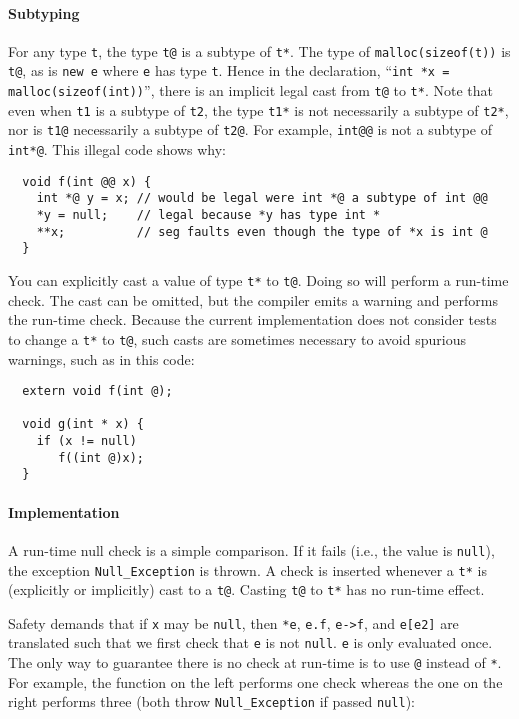 \paragraph{Subtyping}
For any type \texttt{t}, the type \texttt{t@} is a subtype of \texttt{t*}.
The type of \texttt{malloc(sizeof(t))} is \texttt{t@}, as is \texttt{new e}
where \texttt{e} has type \texttt{t}.  Hence in the declaration,
``\texttt{int *x = malloc(sizeof(int))}'', there is an implicit legal
cast from \texttt{t@} to \texttt{t*}.  Note that even when \texttt{t1} is a
subtype of \texttt{t2}, the type \texttt{t1*} is not necessarily a subtype
of \texttt{t2*}, nor is \texttt{t1@} necessarily a subtype of \texttt{t2@}.
For example, \texttt{int@@} is not a subtype of \texttt{int*@}.  This
illegal code shows why:

\begin{verbatim}
  void f(int @@ x) {
    int *@ y = x; // would be legal were int *@ a subtype of int @@
    *y = null;    // legal because *y has type int *
    **x;          // seg faults even though the type of *x is int @
  }
\end{verbatim}

You can explicitly cast a value of type \texttt{t*} to
\texttt{t@}.  Doing so will perform a run-time check.  The
cast can be omitted, but the compiler emits a warning and performs the
run-time check.  Because the current implementation does not
consider tests to change a \texttt{t*} to \texttt{t@}, such casts are
sometimes necessary to avoid spurious warnings, such as in this code:

\begin{verbatim}
  extern void f(int @);

  void g(int * x) {
    if (x != null)
       f((int @)x);
  }
\end{verbatim}

\paragraph{Implementation}
A run-time null check is a simple comparison.  If it fails (i.e., the
value is \texttt{null}), the exception \texttt{Null_Exception} is thrown.
A check is inserted whenever a \texttt{t*} is (explicitly or implicitly)
cast to a \texttt{t@}.  Casting \texttt{t@} to \texttt{t*} has no run-time
effect.

Safety demands that if \texttt{x} may be \texttt{null}, then \texttt{*e},
\texttt{e.f}, \texttt{e->f}, and \texttt{e[e2]} are translated such that we
first check that \texttt{e} is not \texttt{null}.  \texttt{e} is only
evaluated once.  The only way to guarantee there is no check at
run-time is to use \texttt{@} instead of \texttt{*}.  For example, the
function on the left performs one check whereas the one on the right
performs three (both throw \texttt{Null_Exception} if passed
\texttt{null}):

